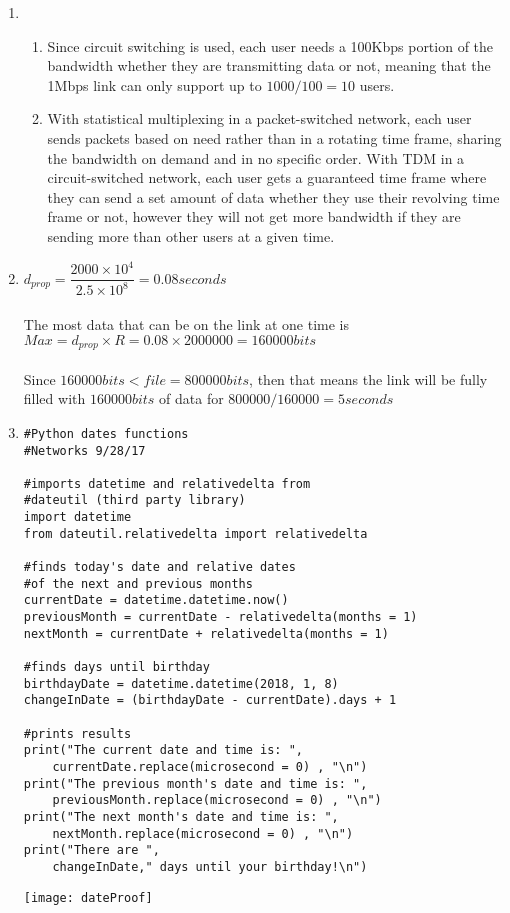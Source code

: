 \documentclass[12pt]{article}
\begin{document}
\begin{enumerate}
\begin{enumerate}
		\end{enumerate}

	\item \begin{enumerate}
			\item Since circuit switching is used, each user needs a 100Kbps portion of the bandwidth whether they are transmitting data or not, meaning that the 1Mbps link can only support up to $1000 / 100 = 10$ users. 
			\item With statistical multiplexing in a packet-switched network, each user sends packets based on need rather than in a rotating time frame, sharing the bandwidth on demand and in no specific order. With TDM in a circuit-switched network, each user gets a guaranteed time frame where they can send a set amount of data whether they use their revolving time frame or not, however they will not get more bandwidth if they are sending more than other users at a given time.
		\end{enumerate}

	\item $d_{prop} = \dfrac{2000\times 10^4}{2.5\times 10^8} = 0.08seconds$\\
	\\
	The most data that can be on the link at one time is $Max = d_{prop} \times R = 0.08 \times 2000000 = 160000bits$\\
	\\
	Since $160000 bits < file = 800000bits$, then that means the link will be fully filled with $160000bits$ of data for $800000 / 160000 = 5seconds$\\

	\item \begin{verbatim}
#Python dates functions
#Networks 9/28/17

#imports datetime and relativedelta from
#dateutil (third party library)
import datetime
from dateutil.relativedelta import relativedelta

#finds today's date and relative dates
#of the next and previous months
currentDate = datetime.datetime.now()
previousMonth = currentDate - relativedelta(months = 1)
nextMonth = currentDate + relativedelta(months = 1)

#finds days until birthday
birthdayDate = datetime.datetime(2018, 1, 8)
changeInDate = (birthdayDate - currentDate).days + 1

#prints results
print("The current date and time is: ",
    currentDate.replace(microsecond = 0) , "\n")
print("The previous month's date and time is: ", 
    previousMonth.replace(microsecond = 0) , "\n")
print("The next month's date and time is: ",
    nextMonth.replace(microsecond = 0) , "\n")
print("There are ",
    changeInDate," days until your birthday!\n")
		\end{verbatim}
		\texttt{[image: dateProof]}\\


\end{enumerate}
\end{document}
